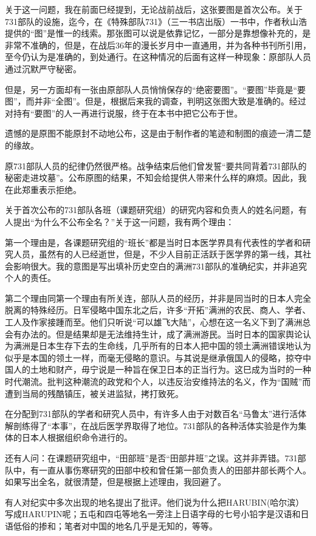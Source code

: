 \documentclass[a4paper,12pt,UTF8,twoside]{ctexbook}
\begin{document}
关于这一问题，我在前面巳经提到，无论战前战后，这张要图是首次公布。关于731部队的设施，迄今，在《特殊部队731》（三一书店出版）一书中，作者秋山浩提供的“图”是惟一的线索。那张图可以说是依靠记忆，一部分是靠想像补充的，是非常不准确的，但是，在战后36年的漫长岁月中一直通用，并为各种书刊所引用，至今仍认为是准确的，到处通行。在这种情况的后面有这样一种现象：原部队人员通过沉默严守秘密。

但是，另一方面却有一张由原部队人员悄悄保存的“绝密要图”。“要图”毕竟是“要图”，而并非“全图”。但是，根据后来我的调查，判明这张图大致是准确的。经过对持有“要图”的人一再进行说服，终于在本书中把它公布于世。

遗憾的是原图不能原封不动地公布，这是由于制作者的笔迹和制图的痕迹一清二楚的缘故。

原731部队人员的纪律仍然很严格。战争结束后他们曾发誓“要共同背着731部队的秘密走进坟墓”。公布原图的结果，不知会给提供人带来什么样的麻烦。因此，我在此郑重表示拒绝。

关于首次公布的731部队各班（课题研究组）的研究内容和负责人的姓名问题，有人提出“为什么不公布全名？”关于这一问题，我有两个理由：

第一个理由是，各课题研究组的“班长”都是当时日本医学界具有代表性的学者和研究人员，虽然有的人已经逝世，但是，不少人目前正活跃于医学界的第一线，其社会影响很大。我的意图是写出填补历史空白的满洲731部队的准确纪实，并非追究个人的责任。

第二个理由同第一个理由有所关连，部队人员的经历，并非是同当时的日本人完全脱离的特殊经历。日军侵略中国东北之后，许多“开拓”满洲的农民、商人、学者、工人及作家接踵而至。他们只听说“可以雄飞大陆”，心想在这一名义下到了满洲总会有办法的。但是结果却是无法维持生计，成了满洲游民。当时日本的国家舆论认为满洲是日本生存下去的生命线，几乎所有的日本人把中国的领土满洲错误地认为似乎是本国的领土一样，而毫无侵略的意识。与其说是继承俄国人的侵略，掠夺中国人的土地和财产，毋宁说是一种旨在保卫日本的正当行为。这巳成为当时的一种时代潮流。批判这种潮流的政党和个人，以违反治安维持法的名义，作为“国贼”而遭到当局的残酷镇压，被关进监狱，拷打致死。

在分配到731部队的学者和研究人员中，有许多人由于对数百名“马鲁太”进行活体解剖练得了“本事”，在战后医学界取得了地位。731部队的各种活体实验是作为集体的日本人根据组织命令进行的。

还有人问：在课题研究组中，“田部班”是否“田部井班”之误。这并非弄错。731部队中，有一直从事伤寒研究的田部中校和曾任第一部负责人的田部井部长两个人。如果写出全名，就很清楚，但是根据上述理由，我回避了。

有人对纪实中多次出现的地名提出了批评。他们说为什么把HARUBIN(哈尔滨）写成HARUPIN呢；五屯和四屯等地名一旁注上日语字母的七号小铅字是汉语和日语低俗的掺和；笔者对中国的地名几乎是无知的，等等。
\end{document}
